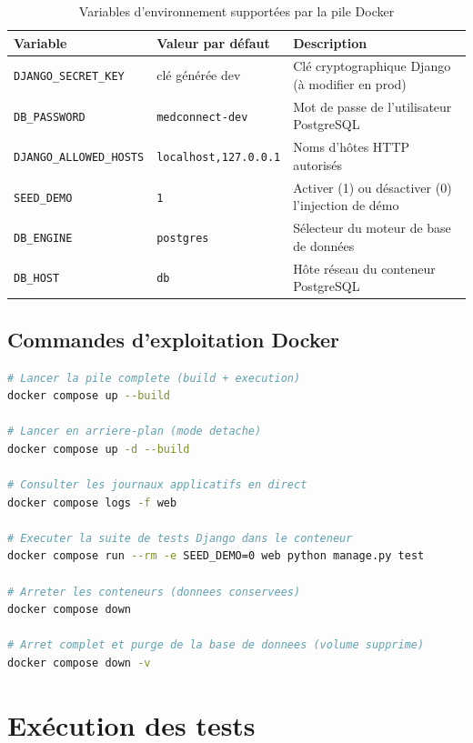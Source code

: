 \documentclass[12pt,a4paper]{report}
\begin{document}
\begin{table}[H]
\centering
\caption{Variables d'environnement supportées par la pile Docker}
\renewcommand{\arraystretch}{1.4}
\begin{tabular}{|p{4.5cm}|p{3.5cm}|p{6cm}|}
  \hline
  \rowcolor{medaccent}
  \textbf{Variable} & \textbf{Valeur par défaut} & \textbf{Description} \\
  \hline
  \texttt{DJANGO\_SECRET\_KEY} & clé générée dev & Clé cryptographique Django (à modifier en prod) \\
  \hline
  \texttt{DB\_PASSWORD} & \texttt{medconnect-dev} & Mot de passe de l'utilisateur PostgreSQL \\
  \hline
  \texttt{DJANGO\_ALLOWED\_HOSTS} & \texttt{localhost,127.0.0.1} & Noms d'hôtes HTTP autorisés \\
  \hline
  \texttt{SEED\_DEMO} & \texttt{1} & Activer (1) ou désactiver (0) l'injection de démo \\
  \hline
  \texttt{DB\_ENGINE} & \texttt{postgres} & Sélecteur du moteur de base de données \\
  \hline
  \texttt{DB\_HOST} & \texttt{db} & Hôte réseau du conteneur PostgreSQL \\
  \hline
\end{tabular}
\end{table}

\subsection{Commandes d'exploitation Docker}

\begin{lstlisting}[language=bash, caption={Commandes usuelles de gestion Docker}]
# Lancer la pile complete (build + execution)
docker compose up --build

# Lancer en arriere-plan (mode detache)
docker compose up -d --build

# Consulter les journaux applicatifs en direct
docker compose logs -f web

# Executer la suite de tests Django dans le conteneur
docker compose run --rm -e SEED_DEMO=0 web python manage.py test

# Arreter les conteneurs (donnees conservees)
docker compose down

# Arret complet et purge de la base de donnees (volume supprime)
docker compose down -v
\end{lstlisting}

\section{Exécution des tests}
\end{document}

